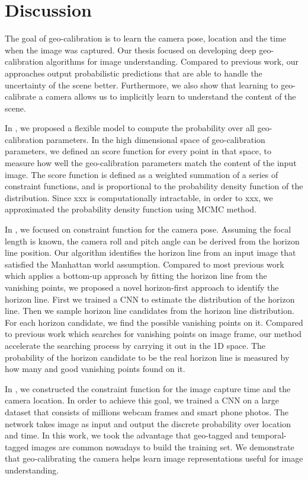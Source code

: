 \chapter{Discussion}
\label{chap:discussion}

The goal of geo-calibration is to learn the camera pose, location and
the time when the image was captured.
Our thesis focused on developing deep geo-calibration algorithms for
image understanding.
Compared to previous work, our approaches output probabilistic
predictions that are able to handle the uncertainty of the scene
better. Furthermore, we also show that
learning to geo-calibrate a camera allows us to implicitly learn to
understand the content of the scene.


In , we proposed a flexible model to compute the
probability over all geo-calibration parameters. In the high
dimensional space of geo-calibration parameters, we defined an score
function for every point in that space, to measure how well the
geo-calibration parameters match the content of the input image. The
score function is defined as a weighted summation of a series of
constraint functions, and is proportional to the probability density
function of the distribution. Since xxx is computationally
intractable, in order to xxx, we approximated the probability
density function using MCMC method.

In , we focused on constraint function for the
camera pose. Assuming the focal length is known, the camera roll and
pitch angle can be derived from the horizon line position. Our
algorithm identifies the horizon line from an input image that
satisfied the Manhattan world assumption.
Compared to most previous work which applies a bottom-up approach by
fitting the horizon line from the vanishing points, we proposed a
novel horizon-first approach to identify the horizon line.
First we trained a CNN to estimate the distribution of the horizon
line. Then we sample horizon line candidates from the horizon line
distribution. For each horizon candidate, we find the possible
vanishing points on it. Compared to previous work which searches for 
vanishing points on image frame, our method accelerate the searching
process by carrying it out in the 1D space. The probability of the
horizon candidate to be the real horizon line is measured by how many
and good vanishing points found on it. 

In , we constructed the constraint function for 
the image capture time and the camera location. In order to achieve
this goal, we trained a CNN on a large dataset that consists of
millions webcam frames and smart phone photos. The network takes image
as input and output the discrete probability over location and time.
In this work, we took the advantage that geo-tagged and
temporal-tagged images are common nowadays to build the training set.
We demonstrate that geo-calibrating the camera helps learn image
representations useful for image understanding.

